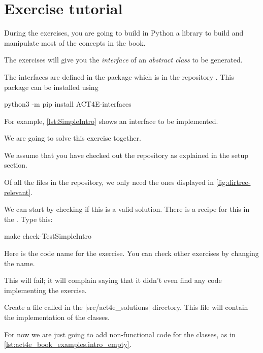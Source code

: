 
\section{Exercise tutorial}
\label{sec:exercise-tutorial}

During the exercises, you are going to build in Python a library to build and manipulate most of the concepts in the book.

The exercises will give you the \emph{interface} of an \emph{abstract class} to be generated.

The interfaces are defined in the package  which is in the repository .
This package can be installed using

\begin{console}
	python3 -m pip install ACT4E-interfaces
\end{console}

For example, \cref{lst:SimpleIntro} shows an interface  to be implemented.


We are going to solve this exercise together.

We assume that you have checked out the repository as explained in the setup section.

Of all the files in the repository, we only need the ones displayed in \cref{fig:dirtree-relevant}.

We can start by checking if this is a valid solution.
There is a recipe for this in the .
Type this:

\begin{console}
	make check-TestSimpleIntro
\end{console}

Here  is the code name for the exercise.
You can check other exercises by changing the name.

This will fail; it will complain saying that it didn't even find any code implementing the exercise.

Create a file called  in the \files|src/act4e_solutions| directory.
This file will contain the implementation of the classes.

For now we are just going to add non-functional code for the classes, as in \cref{lst:act4e_book_examples.intro_empty}.

\begin{longcode}
	\caption{}

	\label{lst:act4e_book_examples.intro_empty}
\end{longcode}

